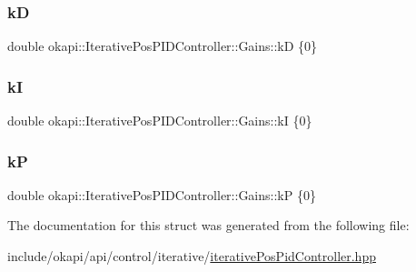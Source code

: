 \subsubsection{\texorpdfstring{kD}{kD}}
{\footnotesize\ttfamily double okapi\+::\+Iterative\+Pos\+P\+I\+D\+Controller\+::\+Gains\+::kD \{0\}}

\mbox{\label{structokapi_1_1IterativePosPIDController_1_1Gains_ad3fd4e3ac5980917b3d98dc486f0c51d}} 
\subsubsection{\texorpdfstring{kI}{kI}}
{\footnotesize\ttfamily double okapi\+::\+Iterative\+Pos\+P\+I\+D\+Controller\+::\+Gains\+::kI \{0\}}

\mbox{\label{structokapi_1_1IterativePosPIDController_1_1Gains_afe6336add0771e75884db9edf272ae56}} 
\subsubsection{\texorpdfstring{kP}{kP}}
{\footnotesize\ttfamily double okapi\+::\+Iterative\+Pos\+P\+I\+D\+Controller\+::\+Gains\+::kP \{0\}}



The documentation for this struct was generated from the following file\+:\begin{DoxyCompactItemize}
\item 
include/okapi/api/control/iterative/\mbox{\hyperlink{iterativePosPidController_8hpp}{iterative\+Pos\+Pid\+Controller.\+hpp}}\end{DoxyCompactItemize}
